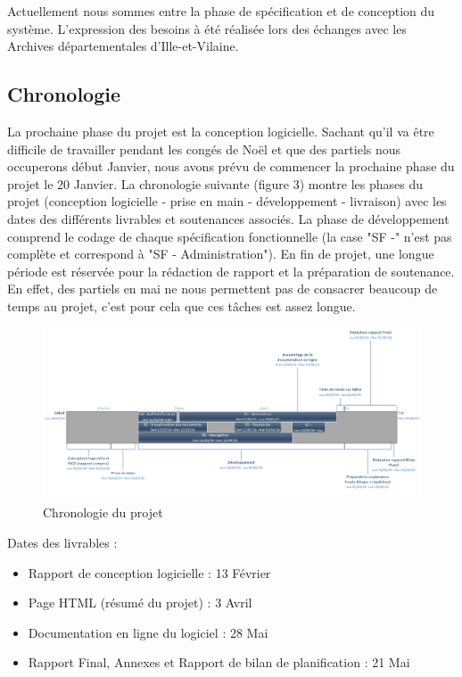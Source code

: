 \documentclass[a4paper]{article}
\begin{document}
	Actuellement nous sommes entre la phase de spécification et de conception du système. L'expression des besoins à été réalisée lors des échanges avec les Archives départementales d’Ille-et-Vilaine.
	
\subsection{Chronologie}

	La prochaine phase du projet est la conception logicielle. Sachant qu'il va être difficile de travailler pendant les congés de Noël et que des partiels nous occuperons début Janvier, nous avons prévu de commencer la prochaine phase du projet le 20 Janvier. La chronologie suivante (figure 3) montre les phases du projet (conception logicielle - prise en main - développement - livraison) avec les dates des différents livrables et soutenances associés. La phase de développement comprend le codage de chaque spécification fonctionnelle (la case "SF -" n'est pas complète et correspond à "SF - Administration"). En fin de projet, une longue période est réservée pour la rédaction de rapport et la préparation de soutenance. En effet, des partiels en mai ne nous permettent pas de consacrer beaucoup de temps au projet, c'est pour cela que ces tâches est assez longue.
	
\begin{figure}[H]
\centering
\includegraphics[width=\textwidth]{chronologie.png}
\caption{Chronologie du projet}
\label{fig:chronologie}
\end{figure}

	Dates des livrables :

\begin{itemize}
\item Rapport de conception logicielle : 13 Février
\item Page HTML (résumé du projet) : 3 Avril
\item Documentation en ligne du logiciel : 28 Mai
\item Rapport Final, Annexes et Rapport de bilan de planification : 21 Mai
\end{itemize}
\end{document}
